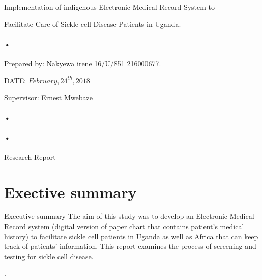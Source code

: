 \documentclass[12pt,]{article}
\begin{document}
\begin{titlepage}
\centerline{Implementation of indigenous Electronic Medical Record System to\\}
\centerline{ Facilitate Care of Sickle cell Disease Patients in Uganda.\\}
\paragraph*{•}
\centerline{  Prepared by:  Nakyewa irene 16/U/851 216000677.\\}
\centerline{DATE: $February,24^{th},2018$\\}
\centerline{Supervisor: Ernest Mwebaze\\}

\paragraph*{•}
\paragraph*{•}
  \centerline{Research Report}
\date{\today}
\end{titlepage}

\newpage



\section{Exective summary}
Executive summary
The aim of this study was to develop an Electronic Medical Record system (digital version of paper chart that contains patient’s medical history) to facilitate sickle cell patients in Uganda as well as Africa that can keep track of patients’ information. This report examines the process of screening and testing for sickle cell disease.
 
.
\end{document}
